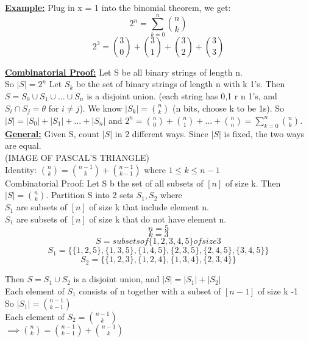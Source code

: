 \documentclass[12pt]{article}
\newcommand{\myt}[1]{\textbf{\underline{#1}}}
\begin{document}
	\myt{Example:} Plug in x = 1 into the binomial theorem, we get:\\
	$$2^n = \sum_{k=0}^{n}{n \choose k}$$
	$$2^3 = {3 \choose 0} + {3 \choose 1} + {3 \choose 2} + {3 \choose 3}$$
	
	\myt{Combinatorial Proof:} Let S be all binary strings of length n.\\
	
	So $|S| = 2^n$ Let $S_k$ be the set of binary strings of length n with k 1's. Then $S = S_0 \cup S_1 \cup ... \cup S_n$ is a disjoint union. (each string has 0,1 r n 1's, and $S_i \cap S_j = \theta$ for $i \neq j$). We know $|S_k| = {n \choose k}$ (n bits, choose k to be 1s). So $|S| = |S_0| + |S_1| + ... + |S_n|$ and $2^n = {n \choose 0} + {n \choose 1} + ... + {n \choose n} = \sum_{k=0}^{n}{n \choose k}$.\\
	
	\myt{General:} Given S, count $|S|$ in 2 different ways. Since $|S|$ is fixed, the two ways are equal.\\
	(IMAGE OF PASCAL'S TRIANGLE)\\
	
	Identity: ${n \choose k} = {n-1 \choose k} + {n-1 \choose k-1}$ where $1 \leq k \leq n-1$\\
	
	Combinatorial Proof: Let S b the set of all subsets of $[n]$ of size k. Then $|S| = {n \choose k}$. Partition S into 2 sets $S_1, S_2$ where \\
	$S_1$ are subsets of $[n]$ of size k that include element n.\\
	$S_1$ are subsets of $[n]$ of size k that do not have element n.\\
	$$n = 5$$
	$$k = 3$$
	$$S = subsets of \{1,2,3,4,5\} of size 3$$
	$$S_1 = \{\{1,2,5\}, \{1,3,5\}, \{1,4,5\}, \{2,3,5\}, \{2,4,5\}, \{3,4,5\}\}$$
	$$S_2 = \{\{1,2,3\}, \{1,2,4\}, \{1,3,4\}, \{2,3,4\}\}$$
	
	Then $S = S_1 \cup S_2$ is a disjoint union, and $|S| = |S_1| + |S_2|$\\
	Each element of $S_1$ consists of n together with a subset of $[n-1]$ of size k -1\\
	So $|S_1| = {n-1 \choose k-1}$\\
	Each element of $S_2 = {n-1 \choose k}$\\
	$\implies {n \choose k} = {n-1 \choose k-1} + {n-1 \choose k}$\\
	
	
\end{document}
